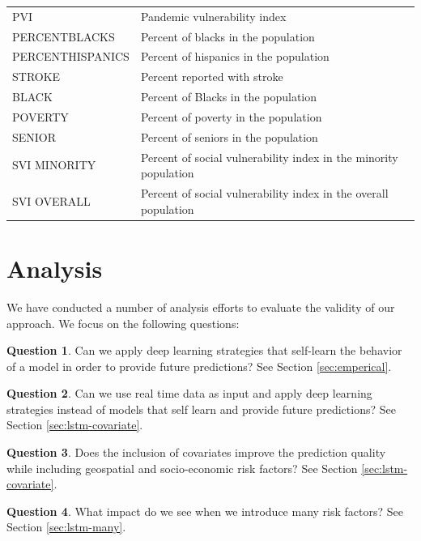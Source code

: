 \documentclass[12pt]{article}
\theoremstyle{definition}
\newtheorem{question}{Question}
\renewcommand{\_}{%
    \textunderscore\hspace{0pt}%
}
\begin{document}
\begin{table}[!hptb]
{\begin{tabular}{ll}
 PVI 		  & Pandemic vulnerability index \\
 PERCENTBLACKS 	  & Percent of blacks in the population\\
 PERCENTHISPANICS & Percent of hispanics in the population\\
 STROKE 	  & Percent reported with stroke\\
 BLACK	  & Percent of Blacks in the population\\
 POVERTY & Percent of poverty in the population\\
 SENIOR  & Percent of seniors in the population\\
 SVI\_MINORITY 	  & Percent of social vulnerability index in the minority population\\
 SVI\_OVERALL 	  & Percent of social vulnerability index in the overall population\\
\bottomrule
\end{tabular}
}
\end{table}


\section{Analysis}

We have conducted a number of analysis efforts to evaluate the validity of our approach. We focus on the following questions:

\begin{question} Can we apply deep learning strategies that self-learn the behavior of a model in order to provide future predictions? See Section \ref{sec:emperical}.
\label{q:1}
\end{question}

\begin{question} Can we use real time data as input and apply deep learning strategies instead of models that self learn and provide future predictions? See Section \ref{sec:lstm-covariate}.
\label{q:2}
\end{question}

\begin{question} Does the inclusion of covariates improve the prediction quality while including geospatial and socio-economic risk factors? See Section \ref{sec:lstm-covariate}.
\label{q:3}
\end{question}

\begin{question} What impact do we see when we introduce many risk factors? See Section \ref{sec:lstm-many}.
\label{q:4}
\end{question}
\end{document}
